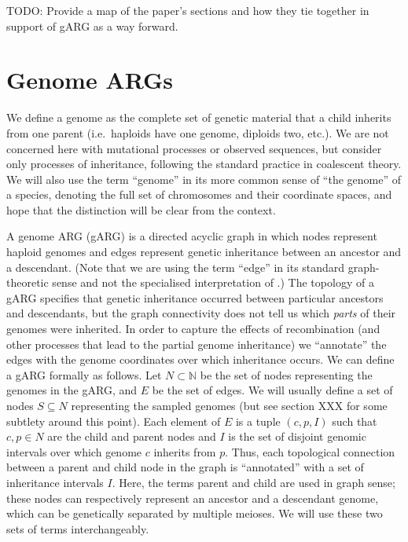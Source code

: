 \documentclass{article}
\begin{document}
TODO: Provide a map of the paper's sections and how they tie together in support of gARG as a way forward.

\section*{Genome ARGs}
We define a genome as the complete set of genetic material that a child
inherits from one parent (i.e.\ haploids have one genome, diploids two, etc.).
We are not concerned here with mutational processes or observed sequences,
but consider only processes of inheritance,
following the standard practice in coalescent theory.
We will also use the term ``genome'' in its
more common sense of ``the genome'' of a species, denoting the full set
of chromosomes and their coordinate spaces, and hope that the distinction
will be clear from the context.

A genome ARG (gARG) is a directed acyclic graph in which nodes represent
haploid genomes and edges represent
genetic inheritance between an ancestor and a descendant.
(Note that we are using the term ``edge'' in its standard
graph-theoretic sense
and not the specialised interpretation of
\cite{shipilina2023origin}.)
The topology of a gARG specifies that genetic inheritance
occurred between particular
ancestors and descendants, but the graph connectivity
does not tell us which \emph{parts} of their genomes were inherited.
In order to capture the effects of recombination
(and other processes that lead to the partial genome inheritance)
 we ``annotate'' the edges with the genome
coordinates over which inheritance occurs.
We can define a gARG formally as follows.
Let $N \subset \mathbb{N}$ be the set of nodes representing
the genomes in the gARG, and $E$ be the set of edges.
We will usually define a set of nodes $S \subseteq N$
representing the sampled genomes
(but see section XXX for some subtlety around this point).
Each element of $E$ is a tuple $(c, p, I)$ such that $c, p \in N$ are the child and
parent nodes and $I$ is the set of disjoint genomic intervals
over
which genome $c$ inherits from $p$. Thus, each topological connection between
 a parent and child node in the graph is ``annotated'' with a set of
inheritance intervals $I$.
Here, the terms parent and child are used in graph sense;
these nodes can respectively represent an ancestor and a descendant genome,
which can be genetically separated by multiple meioses.
We will use these two sets of terms interchangeably.
\end{document}
